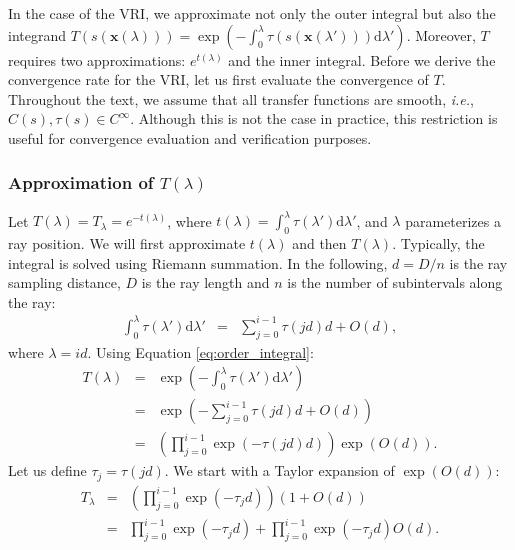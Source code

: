 In the case of the VRI, we approximate not only the outer integral but
also the integrand $T(s(\mathbf{x}(\lambda))) =
\exp\left(-\int_0^{\lambda} \tau(s(\mathbf{x}(\lambda')))
\mathrm{d}\lambda' \right)$. Moreover, $T$ requires two
approximations: $e^{t(\lambda)}$ and the inner integral. Before we derive the
convergence rate for the VRI, let us first evaluate the convergence of
$T$. Throughout the text, we assume that all transfer functions are
smooth, {\em i.e.}, $C(s), \tau(s) \in C^\infty$. Although
this is not the case in practice, this restriction is useful for convergence
evaluation and verification purposes.

\subsubsection{Approximation of $T(\lambda)$}
\label{appx:approximationT}

Let $T(\lambda) = T_\lambda = e^{-t(\lambda)}$, where $t(\lambda) = \int_0^{\lambda} \tau(\lambda')
\mathrm{d}\lambda'$, and $\lambda$ parameterizes a ray position. We
will first approximate $t(\lambda)$ and then $T(\lambda)$. Typically, the
integral is solved using Riemann summation. 
In the following, $d = D / n$ is the ray sampling distance, 
$D$ is the ray length and $n$ is the number of subintervals along the ray:
\begin{eqnarray}
\int_0^{\lambda} \tau(\lambda') \mathrm{d}\lambda' & = &
\sum_{j=0}^{i-1}\tau(j d) d + O(d) \label{eq:order_integral},
\end{eqnarray}
%
where $\lambda = i d$. Using Equation \eqref{eq:order_integral}:
\begin{eqnarray}
T(\lambda) &=& \exp\left(-\int_0^{\lambda} \tau(\lambda')
\mathrm{d}\lambda'\right)\\ 
 & = & \exp\left(-\sum_{j=0}^{i-1}\tau(j d) d + O(d)\right)\\ 
& = & \left(\prod_{j=0}^{i-1}\exp\left(-\tau(j d) d\right)\right)
\exp\left(O(d)\right). 
\end{eqnarray}
%
Let us define $\tau_j = \tau(j d)$. We start with a Taylor expansion
of $\exp\left(O(d)\right)$:
%
\begin{eqnarray}
T_\lambda 
&=& \left(\prod_{j=0}^{i-1}\exp\left(-\tau_j d\right)\right) \left(1 + O(d) \right)\\
& = & \prod_{j=0}^{i-1}\exp\left(-\tau_j d\right) + \prod_{j=0}^{i-1}\exp\left(-\tau_j d\right)O(d).  \label{eq:m}
\end{eqnarray}


